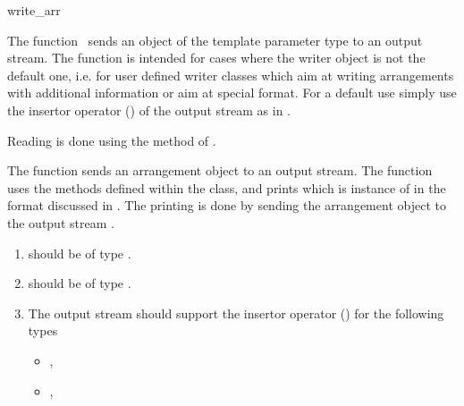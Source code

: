 
\ccRefPageBegin



\begin{ccRefFunction}{write_arr}


\ccDefinition

The function \ccRefName\ sends an object of the template parameter
type  to an output stream. The function is intended
for cases where the writer object is not the default one, i.e. for
user defined writer classes which aim at writing arrangements with
additional information or aim at special format. For a default use
simply use the insertor operator (\ccc{<<}) of the output stream as in
.

Reading is done using the  method of
.


         {The function sends an arrangement object to an output
            stream. The function uses the methods defined within the
             class, and prints  which is instance of
             in the format discussed in
            . The printing is done by sending
            the arrangement object to the output stream . }

\begin{enumerate}
    \item    {}  
             should be of type .
    \item    {}  
             should be of type .
    
   \item    The output stream should support the insertor operator (\ccc{<<}) 
            for the following types
            \begin{itemize}
                \item {},
                \item {}, 
            \end{itemize}
\end{enumerate}

\end{ccRefFunction} %

